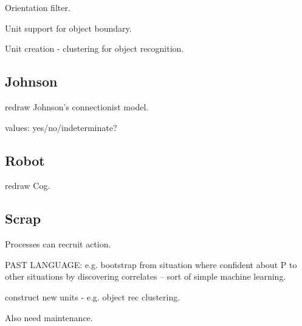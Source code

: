 Orientation filter.

Unit support for object boundary.

Unit creation - clustering for object recognition.


\subsection{Johnson}

redraw Johnson's connectionist model.

values: yes/no/indeterminate?

\subsection{Robot}

redraw Cog.

\subsection{Scrap}

Processes can recruit action.


PAST LANGUAGE:
  e.g. bootstrap from situation where confident about P to other situations
  by discovering correlates -- sort of simple machine learning.

  construct new units - e.g. object rec clustering.


Also need maintenance.


